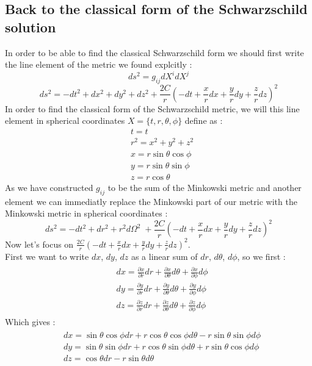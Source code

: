 \documentclass[a4paper,12pt]{article}
\theoremstyle{definition}
\begin{document}
\subsection{Back to the classical form of the Schwarzschild solution}
In order to be able to find the classical Schwarzschild form we should first write the line element of the metric we found explcitly :
\begin{equation}
	ds^2=g_{ij}dX^idX^j
\end{equation}
\begin{equation}
	ds^2=-dt^2+dx^2+dy^2+dz^2+\frac{2C}{r}(-dt+\frac{x}{r}dx+\frac{y}{r}dy+\frac{z}{r}dz)^2
\end{equation}
In order to find the classical form of the Schwarzschild metric, we will this line element in spherical coordinates $X=\{t,r,\theta,\phi\}$ define as :
\begin{align}
	&t=t\\
	&r^2=x^2+y^2+z^2\\
	&x=r\sin{\theta}\cos{\phi}\label{coord-transform-1}\\
	&y=r\sin{\theta}\sin{\phi}\\
	&z=r\cos{\theta}\label{coord-transform-3}
\end{align}
As we have constructed $g_{ij}$ to be the sum of the Minkowski metric and another element we can immediatly replace the Minkowski part of our metric with the Minkowski metric in spherical coordinates :
\begin{equation} \label{line-elem-schwarz}
	ds^2=-dt^2+dr^2+r^2d\Omega^2\;+\frac{2C}{r}(-dt+\frac{x}{r}dx+\frac{y}{r}dy+\frac{z}{r}dz)^2
\end{equation} 
Now let's focus on $\frac{2C}{r}(-dt+\frac{x}{r}dx+\frac{y}{r}dy+\frac{z}{r}dz)^2$.\\
First we want to write $dx$, $dy$, $dz$ as a linear sum of $dr$, $d\theta$, $d\phi$, so we first :
\begin{align}
\begin{split}
	&dx=\frac{\partial x}{\partial r}dr+\frac{\partial x}{\partial \theta}d\theta+\frac{\partial x}{\partial \phi}d\phi\\
	&dy=\frac{\partial y}{\partial r}dr+\frac{\partial y}{\partial \theta}d\theta+\frac{\partial y}{\partial \phi}d\phi\\
	&dz=\frac{\partial z}{\partial r}dr+\frac{\partial z}{\partial \theta}d\theta+\frac{\partial z}{\partial \phi}d\phi
\end{split}
\end{align}
Which gives :
\begin{align}
\begin{split}
	&dx=\sin{\theta}\cos{\phi}dr+r\cos{\theta}\cos{\phi}d\theta-r\sin{\theta}\sin{\phi}d\phi \\
	&dy=\sin{\theta}\sin{\phi}dr+r\cos{\theta}\sin{\phi}d\theta+r\sin{\theta}\cos{\phi}d\phi \\
	&dz=\cos{\theta}dr-r\sin{\theta}d\theta
\end{split}
\end{align}
\end{document}
